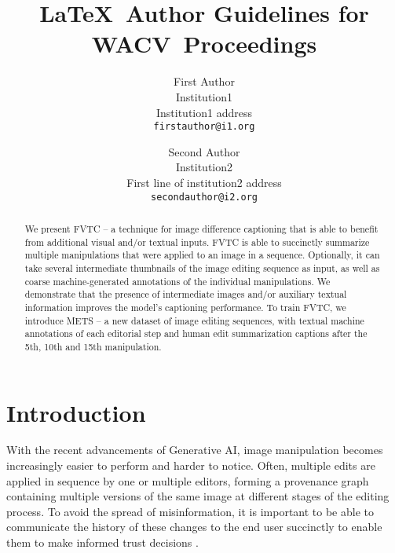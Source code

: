 \documentclass[10pt,twocolumn,letterpaper]{article}
\def\confName{WACV}
\begin{document}
\title{\LaTeX\ Author Guidelines for \confName~Proceedings}

\author{First Author\\
Institution1\\
Institution1 address\\
{\tt\small firstauthor@i1.org}
\and
Second Author\\
Institution2\\
First line of institution2 address\\
{\tt\small secondauthor@i2.org}
}
\maketitle

\begin{abstract}
     We present FVTC -- a technique for image difference captioning that is
     able to benefit from additional visual and/or textual inputs. FVTC is able 
     to succinctly summarize multiple manipulations that were applied to an image
     in a sequence. Optionally, it can take several intermediate thumbnails of the
     image editing sequence as input, as well as coarse machine-generated annotations
     of the individual manipulations. We demonstrate that the presence of intermediate
     images and/or auxiliary textual information improves the model's captioning
     performance. To train FVTC, we introduce METS -- a new dataset of image editing sequences,
     with textual machine annotations of each editorial step and human edit summarization
     captions after the 5th, 10th and 15th manipulation.
\end{abstract}

\section{Introduction}



With the recent advancements of Generative AI, image manipulation becomes increasingly easier to perform and harder to notice. Often, multiple edits are applied in sequence by one or multiple editors, forming a provenance graph containing multiple versions of the same image at different stages of the editing process. To avoid the spread of misinformation, it is important to be able to communicate the history of these changes to the end user succinctly to enable them to make informed trust decisions \cite{witness}.
\end{document}
